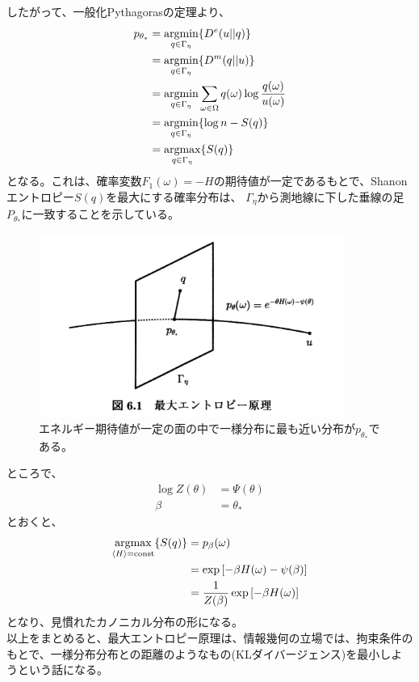 \documentclass[a4paper,11pt]{jsarticle}
\numberwithin{equation}{section}
\begin{document}
したがって、一般化Pythagorasの定理より、
\begin{align}
    p_{\theta_*} &= \underset{q \in \Gamma_\eta}{\text{argmin}} \qty{D^e(u||q)} \\
    &= \underset{q \in \Gamma_\eta}{\text{argmin}} \qty{D^m(q||u)}\\
    &= \underset{q \in \Gamma_\eta}{\text{argmin}} \sum_{\omega \in \Omega} q(\omega) \log \frac{q(\omega)}{u(\omega)}\\
    &= \underset{q \in \Gamma_\eta}{\text{argmin}} \{\log n -S(q)\}\\
    &= \underset{q \in \Gamma_\eta}{\text{argmax}} \{S(q)\}
\end{align}
となる。これは、確率変数$F_1(\omega) = -H$の期待値が一定であるもとで、Shanonエントロピー$S(q)$を最大にする確率分布は、
$\Gamma_{\eta}$から測地線に下した垂線の足$P_{\theta_*}$に一致することを示している。

\begin{figure}[H]
    \begin{center}
    \includegraphics[width=100mm]{entropy.png}
    \end{center}
    \caption{エネルギー期待値が一定の面の中で一様分布に最も近い分布が$p_{\theta_*}$である。}
    \label{fig:one}
\end{figure}

ところで、
\begin{align}
    \log Z(\theta) &= \Psi(\theta)\\
    \beta &= \theta_{*}
\end{align}
とおくと、
\begin{align}
    \underset{\ev{H} = \text{const}}{\text{argmax}} \{S(q)\} &= p_{\beta}(\omega)\\
    &= \exp\left[ -\beta H(\omega) - \psi(\beta) \right]\\
    &= \frac{1}{Z(\beta)} \exp\left[ -\beta H(\omega) \right]
\end{align}
となり、見慣れたカノニカル分布の形になる。\\
以上をまとめると、最大エントロピー原理は、情報幾何の立場では、拘束条件のもとで、一様分布分布との距離のようなもの(KLダイバージェンス)を最小しようという話になる。\\
\end{document}
